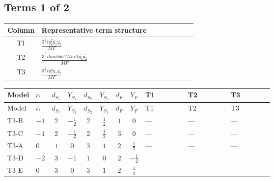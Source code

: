 \documentclass[8pt]{article}
\begin{document}
\begin{landscape}
\subsection*{Terms 1 of 2}
\begin{center}
\begin{tabular}{@{}c >{\raggedright\arraybackslash}p{0.82\linewidth}@{}}
\toprule
Column & Representative term structure \\
\midrule
T1 & \(\displaystyle \frac{3^{\frac{3}{4}} i g_{2}^{2} \overline{y_{1}} \overline{y_{2}}}{MF}\) \\
\midrule
T2 & \(\displaystyle \frac{3^{\frac{3}{4}} i lambda12Inv1 \overline{y_{1}} \overline{y_{2}}}{MF}\) \\
\midrule
T3 & \(\displaystyle \frac{3^{\frac{3}{4}} i g_{1}^{2} \overline{y_{1}} \overline{y_{2}}}{MF}\) \\
\midrule
\bottomrule
\end{tabular}
\end{center}
\smallskip
\tiny
\begin{longtable}{@{}llcccccc >{\raggedright\arraybackslash}p{0.21\linewidth} >{\raggedright\arraybackslash}p{0.21\linewidth} >{\raggedright\arraybackslash}p{0.21\linewidth}@{}}
\toprule
Model & $\alpha$ & $d_{S_1}$ & $Y_{S_1}$ & $d_{S_2}$ & $Y_{S_2}$ & $d_F$ & $Y_F$ & T1 & T2 & T3 \\
\midrule
\endfirsthead
\toprule
Model & $\alpha$ & $d_{S_1}$ & $Y_{S_1}$ & $d_{S_2}$ & $Y_{S_2}$ & $d_F$ & $Y_F$ & T1 & T2 & T3 \\
\midrule
\endhead
T3-B & $-1$ & $2$ & $-\frac{1}{2}$ & $2$ & $\frac{1}{2}$ & $1$ & $0$ & --- & --- & --- \\
\midrule
T3-C & $-1$ & $2$ & $-\frac{1}{2}$ & $2$ & $\frac{1}{2}$ & $3$ & $0$ & --- & --- & --- \\
\midrule
T3-A & $0$ & $1$ & $0$ & $3$ & $1$ & $2$ & $\frac{1}{2}$ & --- & --- & --- \\
\midrule
T3-D & $-2$ & $3$ & $-1$ & $1$ & $0$ & $2$ & $-\frac{1}{2}$ & \scriptsize\adjustbox{max width=\linewidth}{$\begin{gathered} - \frac{11 \cdot 3^{\frac{3}{4}} i g_{2}^{2} \overline{y_{1}} \overline{y_{2}}}{8 MF}\end{gathered}$} & \scriptsize\adjustbox{max width=\linewidth}{$\begin{gathered} - \frac{3^{\frac{3}{4}} i lambda12Inv1 \overline{y_{1}} \overline{y_{2}}}{6 MF}\end{gathered}$} & \scriptsize\adjustbox{max width=\linewidth}{$\begin{gathered} - \frac{3^{\frac{3}{4}} i g_{1}^{2} \overline{y_{1}} \overline{y_{2}}}{8 MF}\end{gathered}$} \\
\midrule
T3-E & $0$ & $3$ & $0$ & $3$ & $1$ & $2$ & $\frac{1}{2}$ & --- & --- & --- \\
\midrule
\bottomrule
\end{longtable}
\clearpage

\end{landscape}
\end{document}
